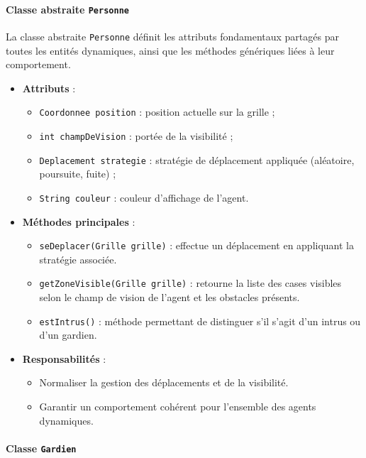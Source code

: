 \paragraph{Classe abstraite \texttt{Personne}}

La classe abstraite \texttt{Personne} définit les attributs fondamentaux partagés par toutes les entités dynamiques, ainsi que les méthodes génériques liées à leur comportement.

\begin{itemize}
    \item \textbf{Attributs} :
    \begin{itemize}
        \item \texttt{Coordonnee position} : position actuelle sur la grille ;
        \item \texttt{int champDeVision} : portée de la visibilité ;
        \item \texttt{Deplacement strategie} : stratégie de déplacement appliquée (aléatoire, poursuite, fuite) ;
        \item \texttt{String couleur} : couleur d'affichage de l'agent.
    \end{itemize}
    \item \textbf{Méthodes principales} :
    \begin{itemize}
        \item \texttt{seDeplacer(Grille grille)} : effectue un déplacement en appliquant la stratégie associée.
        \item \texttt{getZoneVisible(Grille grille)} : retourne la liste des cases visibles selon le champ de vision de l’agent et les obstacles présents.
        \item \texttt{estIntrus()} : méthode permettant de distinguer s’il s’agit d’un intrus ou d’un gardien.
    \end{itemize}
    \item \textbf{Responsabilités} :
    \begin{itemize}
        \item Normaliser la gestion des déplacements et de la visibilité.
        \item Garantir un comportement cohérent pour l'ensemble des agents dynamiques.
    \end{itemize}
\end{itemize}

\vspace{1em}

\paragraph{Classe \texttt{Gardien}}


